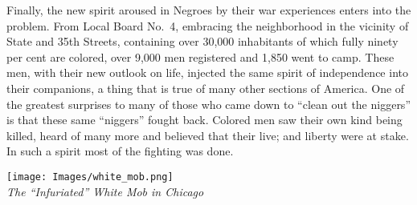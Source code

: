 \documentclass[11pt,article,oneside]{memoir}
\makeatletter
\def\maxwidth{\ifdim\Gin@nat@width>\linewidth\linewidth
\else\Gin@nat@width\fi}
\let\Oldincludegraphics\includegraphics
\renewcommand{\includegraphics}[1]{\Oldincludegraphics[width=\maxwidth]{#1}}
\makeatother
\begin{document}
Finally, the new spirit aroused in Negroes by their war experiences
enters into the problem. From Local Board No.~4, embracing the
neighborhood in the vicinity of State and 35th Streets, containing over
30,000 inhabitants of which fully ninety per cent are colored, over
9,000 men registered and 1,850 went to camp. These men, with their new
outlook on life, injected the same spirit of independence into their
companions, a thing that is true of many other sections of America. One
of the greatest surprises to many of those who came down to ``clean out
the niggers'' is that these same ``niggers'' fought back. Colored men
saw their own kind being killed, heard of many more and believed that
their live; and liberty were at stake. In such a spirit most of the
fighting was done.

\texttt{[image: Images/white\_mob.png]}\\
\emph{The ``Infuriated'' White Mob in Chicago}
\end{document}
